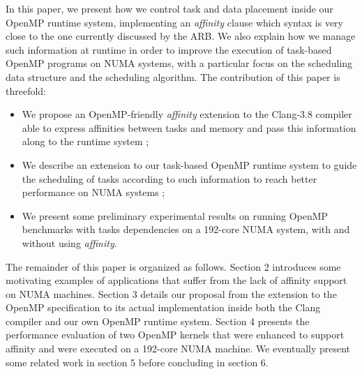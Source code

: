 \documentclass{Styles/llncs}
\begin{document}
In this paper, we present how we control task and data placement inside our OpenMP runtime system, implementing an \emph{affinity} clause which syntax is very close to the one currently discussed by the ARB. We also explain how we manage such information at runtime in order to improve the execution of task-based OpenMP programs on NUMA systems, with a particular focus on the scheduling data structure and the scheduling algorithm.
The contribution of this paper is threefold:
\begin{itemize}
\item We propose an OpenMP-friendly \emph{affinity} extension to the Clang-3.8 compiler able to express affinities between tasks and memory and pass this information along to the runtime system ;
\item We describe an extension to our task-based OpenMP runtime system to guide the scheduling of tasks according to such information to reach better performance on NUMA systems ;
\item We present some preliminary experimental results on running OpenMP benchmarks with tasks dependencies on a 192-core NUMA system, with and without using \emph{affinity}.
\end{itemize}


The remainder of this paper is organized as follows. Section 2 introduces some motivating examples of applications that suffer from the lack of affinity support on NUMA machines. Section 3 details our proposal from the extension to the OpenMP specification to its actual implementation inside both the Clang compiler and our own OpenMP runtime system. Section 4 presents the performance evaluation of two OpenMP kernels that were enhanced to support affinity and were executed on a 192-core NUMA machine. We eventually present some related work in section 5 before concluding in section 6.
\end{document}
